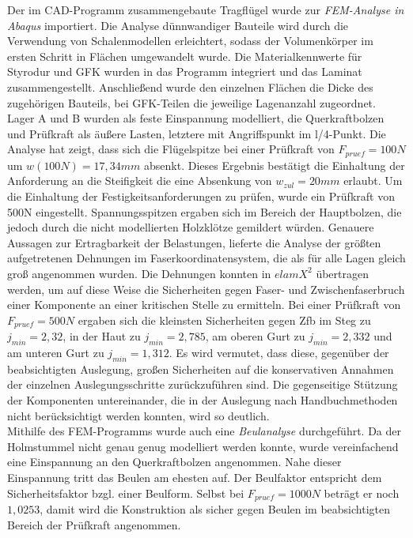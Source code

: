\noindent Der im CAD-Programm zusammengebaute Tragflügel wurde zur \textit{FEM-Analyse in Abaqus} importiert. Die Analyse dünnwandiger Bauteile wird durch die Verwendung von Schalenmodellen erleichtert, sodass der Volumenkörper im ersten Schritt in Flächen umgewandelt wurde. Die Materialkennwerte für Styrodur und GFK wurden in das Programm integriert und das Laminat zusammengestellt. Anschließend wurde den einzelnen Flächen die Dicke des zugehörigen Bauteils, bei GFK-Teilen die jeweilige Lagenanzahl zugeordnet. Lager A und B wurden als feste Einspannung modelliert, die Querkraftbolzen und Prüfkraft als äußere Lasten, letztere mit Angriffspunkt im l/4-Punkt. Die Analyse hat zeigt, dass sich die Flügelspitze bei einer Prüfkraft von $ F_{pruef}=100N $ um $ w(100N)=17,34mm $ absenkt. Dieses Ergebnis bestätigt die Einhaltung der Anforderung an die Steifigkeit die eine Absenkung von $ w_{zul}=20mm $ erlaubt. Um die Einhaltung der Festigkeitsanforderungen zu prüfen, wurde ein Prüfkraft von 500N eingestellt. Spannungsspitzen ergaben sich im Bereich der Hauptbolzen, die jedoch durch die nicht modellierten Holzklötze gemildert würden. Genauere Aussagen zur Ertragbarkeit der Belastungen, lieferte die Analyse der größten aufgetretenen Dehnungen im Faserkoordinatensystem, die als für alle Lagen gleich groß angenommen wurden. Die Dehnungen konnten in $elamX^{2}$ übertragen werden, um auf diese Weise die Sicherheiten gegen Faser- und Zwischenfaserbruch einer Komponente an einer kritischen Stelle zu ermitteln. Bei einer Prüfkraft von $ F_{pruef}=500N $ ergaben sich die kleinsten Sicherheiten gegen Zfb im Steg zu $ j_{min}=2,32 $, in der Haut zu $ j_{min}=2,785 $, am oberen Gurt zu $ j_{min}=2,332 $ und am unteren Gurt zu $ j_{min} =1,312$. Es wird vermutet, dass diese, gegenüber der beabsichtigten Auslegung, großen Sicherheiten auf die konservativen Annahmen der einzelnen Auslegungsschritte zurückzuführen sind. Die gegenseitige Stützung der Komponenten untereinander, die in der Auslegung nach Handbuchmethoden nicht berücksichtigt werden konnten, wird so deutlich.\\

\noindent Mithilfe des FEM-Programms wurde auch eine \textit{Beulanalyse} durchgeführt. Da der Holmstummel nicht genau genug modelliert werden konnte, wurde vereinfachend eine Einspannung an den Querkraftbolzen angenommen. Nahe dieser Einspannung tritt das Beulen am ehesten auf. Der Beulfaktor entspricht dem Sicherheitsfaktor bzgl. einer Beulform. Selbst bei $ F_{pruef}=1000N $ beträgt er noch $ 1,0253 $, damit wird die Konstruktion als sicher gegen Beulen im beabsichtigten Bereich der Prüfkraft angenommen.





